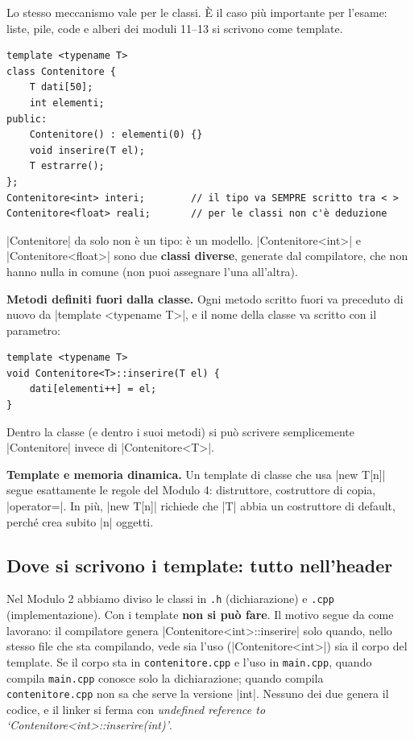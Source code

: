 Lo stesso meccanismo vale per le classi. È il caso più importante per l'esame:
liste, pile, code e alberi dei moduli 11--13 si scrivono come template.
\begin{lstlisting}
template <typename T>
class Contenitore {
    T dati[50];
    int elementi;
public:
    Contenitore() : elementi(0) {}
    void inserire(T el);
    T estrarre();
};
Contenitore<int> interi;        // il tipo va SEMPRE scritto tra < >
Contenitore<float> reali;       // per le classi non c'è deduzione
\end{lstlisting}
\cc|Contenitore| da solo non è un tipo: è un modello. \cc|Contenitore<int>| e
\cc|Contenitore<float>| sono due \textbf{classi diverse}, generate dal
compilatore, che non hanno nulla in comune (non puoi assegnare l'una all'altra).

\textbf{Metodi definiti fuori dalla classe.} Ogni metodo scritto fuori va
preceduto di nuovo da \cc|template <typename T>|, e il nome della classe va scritto
con il parametro:
\begin{lstlisting}
template <typename T>
void Contenitore<T>::inserire(T el) {
    dati[elementi++] = el;
}
\end{lstlisting}
Dentro la classe (e dentro i suoi metodi) si può scrivere semplicemente
\cc|Contenitore| invece di \cc|Contenitore<T>|.

\textbf{Template e memoria dinamica.} Un template di classe che usa \cc|new T[n]|
segue esattamente le regole del Modulo 4: distruttore, costruttore di copia,
\cc|operator=|. In più, \cc|new T[n]| richiede che \cc|T| abbia un costruttore di
default, perché crea subito \cc|n| oggetti.

\subsection*{Dove si scrivono i template: tutto nell'header}

Nel Modulo 2 abbiamo diviso le classi in \texttt{.h} (dichiarazione) e \texttt{.cpp}
(implementazione). Con i template \textbf{non si può fare}. Il motivo segue da come
lavorano: il compilatore genera \cc|Contenitore<int>::inserire| solo quando, nello
stesso file che sta compilando, vede sia l'uso (\cc|Contenitore<int>|) sia il corpo
del template. Se il corpo sta in \texttt{contenitore.cpp} e l'uso in
\texttt{main.cpp}, quando compila \texttt{main.cpp} conosce solo la dichiarazione;
quando compila \texttt{contenitore.cpp} non sa che serve la versione \cc|int|.
Nessuno dei due genera il codice, e il linker si ferma con \emph{undefined reference
to `Contenitore<int>::inserire(int)'}.

